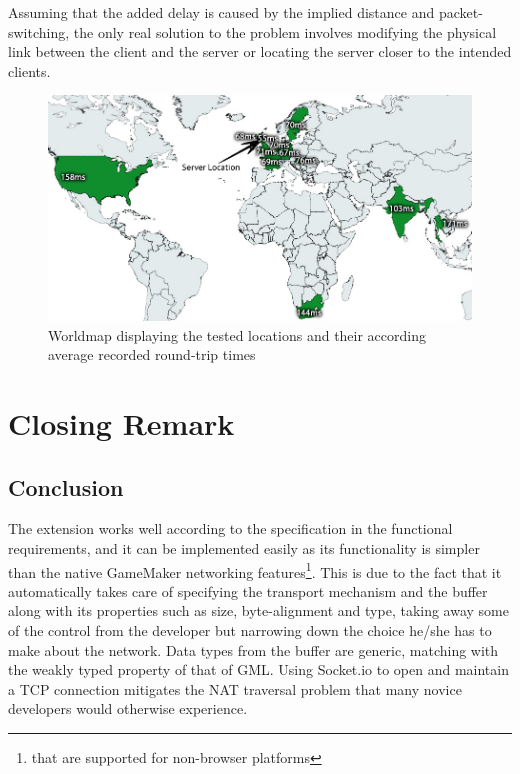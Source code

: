 \documentclass[bsc, 12pt, twoside, singlespacing, parskip, abbrevs, notimes, normalheadings, logo]{styles/infthesis}
\begin{document}
Assuming that the added delay is caused by the implied distance and packet-switching, the only real solution to the problem involves modifying the physical link between the client and the server or locating the server closer to the intended clients.

\begin{figure}
\centering
\includegraphics[scale=0.45]{images/worldmap.jpg}
\caption{Worldmap displaying the tested locations and their according average recorded round-trip times}
\label{fig:worldmap}
\end{figure}





\chapter{Closing Remark}
\section{Conclusion}
The extension works well according to the specification in the functional requirements, and it can be implemented easily as its functionality is simpler than the native GameMaker networking features\footnote{that are supported for non-browser platforms}. This is due to the fact that it automatically takes care of specifying the transport mechanism and the buffer along with its properties such as size, byte-alignment and type, taking away some of the control from the developer but narrowing down the choice he/she has to make about the network. Data types from the buffer are generic, matching with the weakly typed property of that of GML. Using Socket.io to open and maintain a TCP connection mitigates the NAT traversal problem that many novice developers would otherwise experience.
\end{document}
